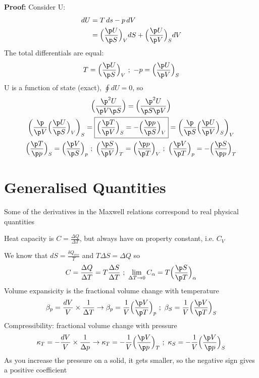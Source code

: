 \documentclass[a4paper, 11pt, normalem]{report}
\begin{document}
\textbf{Proof:}
Consider U:
\begin{align*}
    dU &= T\,ds - p\,dV \\
    &= \Big(\frac{\p U}{\p S}\Big)_V dS + \Big(\frac{\p U}{\p V}\Big)_S dV
\end{align*}
The total differentials are equal:
\begin{equation*}
    T = \Big(\frac{\p U}{\p S}\Big)_V ~;~ -p = \Big(\frac{\p U}{\p V}\Big)_S
\end{equation*}
U is a function of state (exact), $\oint dU = 0$, so
\begin{gather*}
    \Big(\frac{\p^2 U}{\p V \p S}\Big) = \Big(\frac{\p^2 U}{\p S \p V}\Big) \\
    \bigg(\frac{\p}{\p V} \Big(\frac{\p U}{\p S} \Big)_V \bigg)_S = \boxed{\Big(\frac{\p T}{\p V}\Big)_S = -\Big(\frac{\p p}{\p S} \Big)_V} = \bigg(\frac{\p}{\p S} \Big(\frac{\p U}{\p V}\Big)_S \bigg)_V \\
    \Big(\frac{\p T}{\p p}\Big)_S = \Big(\frac{\p V}{\p S}\Big)_p ~;~ \Big(\frac{\p S}{\p V} \Big)_T = \Big(\frac{\p p}{\p T}\Big)_V ~;~ \Big(\frac{\p V}{\p T}\Big)_p = -\Big(\frac{\p S}{\p p} \Big)_T
\end{gather*}

\section{Generalised Quantities}
Some of the derivatives in the Maxwell relations correspond to real physical quantities

Heat capacity is $C = \frac{\Delta Q}{\Delta T}$, but always have on property constant, i.e. $C_V$

We know that $dS = \frac{\delta Q_{rev}}{T}$ and $T\Delta S = \Delta Q$ so
\begin{equation*}
    C = \frac{\Delta Q}{\Delta T} = T\frac{\Delta S}{\Delta T} ~;~ \lim_{\Delta T \to 0} C_{\alpha} = T\Big(\frac{\p S}{\p T}\Big)_{\alpha}
\end{equation*}
Volume expansicity is the fractional volume change with temperature
\begin{equation*}
    \beta_{p} = \frac{dV}{V}\times\frac{1}{\Delta T} \to \beta_{p} = \frac{1}{V} \Big(\frac{\p V}{\p T}\Big)_p ~;~ \beta_S = \frac{1}{V} \Big(\frac{\p V}{\p T}\Big)_S
\end{equation*}
Compressibility: fractional volume change with pressure
\begin{equation*}
    \kappa_T = -\frac{dV}{V} \times \frac{1}{\Delta p} \to \kappa_T = -\frac{1}{V} \Big(\frac{\p V}{\p p}\Big)_T ~;~ \kappa_S = -\frac{1}{V} \Big(\frac{\p V}{\p p}\Big)_S
\end{equation*}
As you increase the pressure on a solid, it gets smaller, so the negative sign gives a positive coefficient
\end{document}

